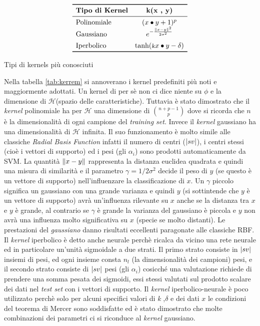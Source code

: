 \begin{table}[htp]
\centering
\[ 
\begin{array}{lc} 
\toprule
\text{\textbf{Tipo di Kernel}} & \text{\textbf{k(x , y)}}  \\
\midrule  
\text{Polinomiale}  &  (x \bullet y +1)^p \\
\text{Gaussiano}  &  e^{-\frac{\norma{x-y}^{2}}{2\sigma^2}}\\[1ex]
\text{Iperbolico}  & \tanh(\text{{\footnotesize {\textsl k}}}x \bullet y - \delta) \\

\bottomrule
\end{array}
\]
 \caption[Kernels più noti]{Tipi di kernels più conosciuti}
\label{tab:kerrem}
\end{table}  

Nella tabella \ref{tab:kerrem} si annoverano i kernel predefiniti più noti e maggiormente adottati. Un kernel di per sè non ci dice niente su $\phi$ e la dimensione di $\mathcal{H}$(spazio delle caratteristiche). Tuttavia è stato dimostrato che il \textit{kernel} polinomiale ha per  $\mathcal{H}$ una dimensione di $\binom{n+p-1}{p}$ dove si ricorda che $n$ è la dimensionalità di ogni campione del \textit{training set}. Invece il \textit{kernel} gaussiano ha una dimensionalità di $\mathcal{H}$ infinita. Il suo funzionamento è molto simile alle classiche \textit{Radial Basis Function} infatti  il numero di centri ($\lvert sv\rvert$), i centri stessi (cioè i vettori di supporto) ed i pesi (gli $\alpha_i$) sono prodotti automaticamente da \ac{SVM}. La quantità $\lVert x-y\rVert$ rappresenta la distanza euclidea quadrata e quindi una misura di similarità e il parametro $\gamma = 1/2\sigma^2$ decide il peso di $y$ (se questo è un vettore di supporto) nell'influenzare la classificazione di $x$. Un $\gamma$ piccolo significa un gaussiano con una grande varianza e quindi $y$ (si sottintende che $y$ è un vettore di supporto) avrà un'influenza rilevante su $x$ anche se la distanza tra $x$ e $y$ è grande, al contrario se $\gamma$ è grande la varianza del gaussiano è piccola e $y$ non avrà una influenza molto significativa su $x$ (specie se molto distanti). Le prestazioni del \textit{gaussiano} danno risultati eccellenti paragonate alle classiche RBF.  Il \textit{kernel} iperbolico è detto anche neurale perchè ricalca da vicino una rete neurale ed in particolare un'unità sigmoidale a due strati. Il primo strato consiste in $\lvert sv\rvert$ insiemi di pesi, ed ogni insieme consta $n_l$ (la dimensionalità dei campioni) pesi, e il secondo strato consiste di $\lvert sv\rvert$ pesi (gli $\alpha_i$) cosicché una valutazione richiede di prendere una somma pesata dei sigmoidi, essi stessi valutati sul prodotto scalare dei dati nel \textit{test set} con i vettori di supporto. Il \textit{kernel} iperbolico-neurale è poco utilizzato perchè solo per alcuni specifici valori di {\footnotesize {\textsl k}} ,$\delta$ e dei dati $x$ le condizioni del teorema di Mercer sono soddisfatte ed è stato dimostrato che molte combinazioni dei parametri ci si riconduce al \textit{kernel} gaussiano.\\
